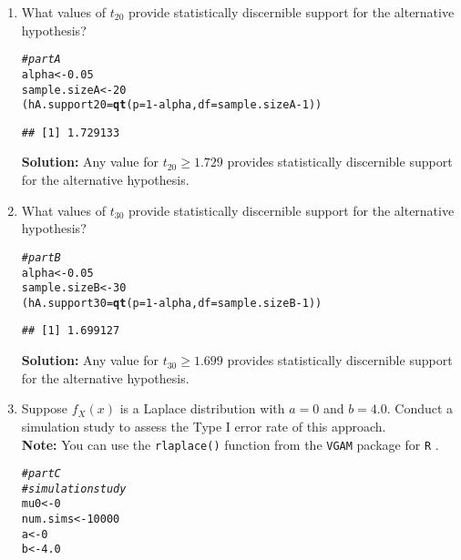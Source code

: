 \documentclass{article}\usepackage[]{graphicx}\usepackage[]{xcolor}
\makeatletter
\newcommand{\hlnum}[1]{\textcolor[rgb]{0.686,0.059,0.569}{#1}}%
\newcommand{\hlcom}[1]{\textcolor[rgb]{0.678,0.584,0.686}{\textit{#1}}}%
\newcommand{\hlopt}[1]{\textcolor[rgb]{0,0,0}{#1}}%
\newcommand{\hldef}[1]{\textcolor[rgb]{0.345,0.345,0.345}{#1}}%
\newcommand{\hlkwb}[1]{\textcolor[rgb]{0.69,0.353,0.396}{#1}}%
\newcommand{\hlkwc}[1]{\textcolor[rgb]{0.333,0.667,0.333}{#1}}%
\newcommand{\hlkwd}[1]{\textcolor[rgb]{0.737,0.353,0.396}{\textbf{#1}}}%
\newenvironment{kframe}{%
 \def\at@end@of@kframe{}%
 \ifinner\ifhmode%
  \def\at@end@of@kframe{\end{minipage}}%
  \begin{minipage}{\columnwidth}%
 \fi\fi%
 \def\FrameCommand##1{\hskip\@totalleftmargin \hskip-\fboxsep
 \colorbox{shadecolor}{##1}\hskip-\fboxsep
     \hskip-\linewidth \hskip-\@totalleftmargin \hskip\columnwidth}%
 \MakeFramed {\advance\hsize-\width
   \@totalleftmargin\z@ \linewidth\hsize
   \@setminipage}}%
 {\par\unskip\endMakeFramed%
 \at@end@of@kframe}
\newenvironment{knitrout}{}{} %
\makeatother
\begin{document}
\begin{enumerate}
\begin{enumerate}
  \item What values of $t_{20}$ provide statistically discernible support for the
  alternative hypothesis?
\begin{knitrout}
\color{fgcolor}\begin{kframe}
\begin{alltt}
  \hlcom{# part A }
\hldef{alpha} \hlkwb{<-} \hlnum{0.05}
\hldef{sample.sizeA} \hlkwb{<-} \hlnum{20}
\hldef{(hA.support20} \hlkwb{=} \hlkwd{qt}\hldef{(}\hlkwc{p} \hldef{=} \hlnum{1}\hlopt{-}\hldef{alpha,} \hlkwc{df} \hldef{= sample.sizeA}\hlopt{-}\hlnum{1}\hldef{))}
\end{alltt}
\begin{verbatim}
## [1] 1.729133
\end{verbatim}
\end{kframe}
\end{knitrout}
\textbf{Solution:} Any value for $t_{20} \geq 1.729$ provides statistically discernible support for the alternative hypothesis.
  \item What values of $t_{30}$ provide statistically discernible support for the
  alternative hypothesis?
\begin{knitrout}
\color{fgcolor}\begin{kframe}
\begin{alltt}
\hlcom{# part B}
\hldef{alpha} \hlkwb{<-} \hlnum{0.05}
\hldef{sample.sizeB} \hlkwb{<-} \hlnum{30}
\hldef{(hA.support30} \hlkwb{=} \hlkwd{qt}\hldef{(}\hlkwc{p} \hldef{=} \hlnum{1}\hlopt{-}\hldef{alpha,} \hlkwc{df} \hldef{= sample.sizeB}\hlopt{-}\hlnum{1}\hldef{))}
\end{alltt}
\begin{verbatim}
## [1] 1.699127
\end{verbatim}
\end{kframe}
\end{knitrout}
\textbf{Solution:} Any value for $t_{30} \geq 1.699$ provides statistically discernible support for the alternative hypothesis.
  \item Suppose $f_X(x)$ is a Laplace distribution with $a=0$ and $b=4.0$.
  Conduct a simulation study to assess the Type I error rate of this approach.\\
  \textbf{Note:} You can use the \texttt{rlaplace()} function from the \texttt{VGAM}
  package for \texttt{R} \citep{VGAM}.
\begin{knitrout}
\color{fgcolor}\begin{kframe}
\begin{alltt}
\hlcom{# part C }
\hlcom{# simulation study }
\hldef{mu0} \hlkwb{<-} \hlnum{0}
\hldef{num.sims} \hlkwb{<-} \hlnum{10000}
\hldef{a} \hlkwb{<-} \hlnum{0}
\hldef{b} \hlkwb{<-} \hlnum{4.0}


\end{alltt}
\end{kframe}
\end{knitrout}
\end{enumerate}
\end{enumerate}
\end{document}
